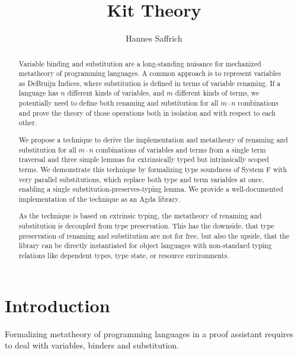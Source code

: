 \documentclass[sigplan,10pt]{acmart}
\title{Kit Theory}
\author{Hannes Saffrich}
\affiliation{
  \institution{University of Freiburg}      %
  \country{Germany}                         %
}
\begin{document}
  \begin{abstract}
    Variable binding and substitution are a long-standing nuisance for mechanized
    metatheory of programming languages. A common approach is to represent
    variables as DeBruijn Indices, where substitution is defined in terms of
    variable renaming. If a language has $n$ different kinds of variables, and
    $m$ different kinds of terms, we potentially need to define both
    renaming and substitution for all $m\cdot n$ combinations and prove the
    theory of those operations both in isolation and with respect to each other.


    We propose a technique to derive the implementation and metatheory of
    renaming and substitution for all $m\cdot n$ combinations of variables and terms
    from a single term traversal and three simple lemmas for extrinsically typed
    but intrinsically scoped terms.
    We demonstrate this technique by formalizing type soundness of System F with
    very parallel substitutions, which replace both type and term variables at
    once, enabling a single substitution-preserves-typing lemma.
    We provide a well-documented implementation of the technique as an Agda
    library.

    As the technique is based on extrinsic typing, the metatheory of renaming
    and substitution is decoupled from type preservation.
    This has the downside, that type preservation of renaming and substitution
    are not for free, but also the upside, that the library can be directly
    instantiated for object languages with non-standard typing relations like
    dependent types, type state, or resource environments.
  \end{abstract}

  \maketitle



  \AgdaNoSpaceAroundCode{}

  \section{Introduction}
  Formalizing metatheory of programming languages in a proof assistant 
  requires to deal with variables, binders and substitution.
\end{document}
